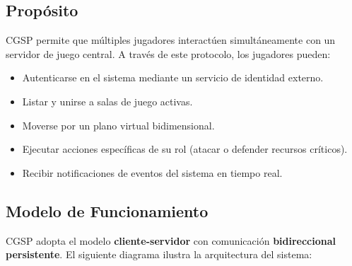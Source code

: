 \documentclass[12pt, letterpaper]{article}
\begin{document}
\subsection{Propósito}

CGSP permite que múltiples jugadores interactúen simultáneamente con un servidor de
juego central. A través de este protocolo, los jugadores pueden:

\begin{itemize}[leftmargin=2em]
    \item Autenticarse en el sistema mediante un servicio de identidad externo.
    \item Listar y unirse a salas de juego activas.
    \item Moverse por un plano virtual bidimensional.
    \item Ejecutar acciones específicas de su rol (atacar o defender recursos críticos).
    \item Recibir notificaciones de eventos del sistema en tiempo real.
\end{itemize}

\subsection{Modelo de Funcionamiento}

CGSP adopta el modelo \textbf{cliente-servidor} con comunicación \textbf{bidireccional
persistente}. El siguiente diagrama ilustra la arquitectura del sistema:
\end{document}
